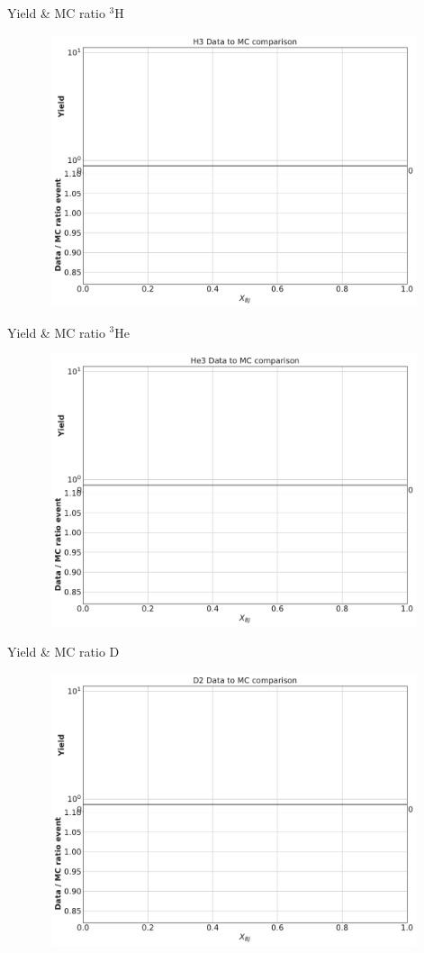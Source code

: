 \documentclass[12pt,usenames,dvipsnames]{beamer}
\newcommand{\backupend}{
	\setcounter{framenumber}{\value{finalframe}}
}
\begin{document}
\begin{frame}{Yield \& MC ratio $^3$H }
\vspace{-1.25cm}
\begin{figure}
	\includegraphics[width=12cm,height=8cm]{../images/H3yields.pdf}
\end{figure}
\end{frame}
\begin{frame}{Yield \& MC ratio $^3$He }
\vspace{-1.25cm}
\begin{figure}
	\includegraphics[width=12cm,height=8cm]{../images/He3yields.pdf}
\end{figure}
\end{frame}

\begin{frame}{Yield \& MC ratio D }
\vspace{-1.25cm}
\begin{figure}
	\includegraphics[width=12cm,height=8cm]{../images/D2yields.pdf}
\end{figure}
\end{frame}


\backupend
\end{document}
